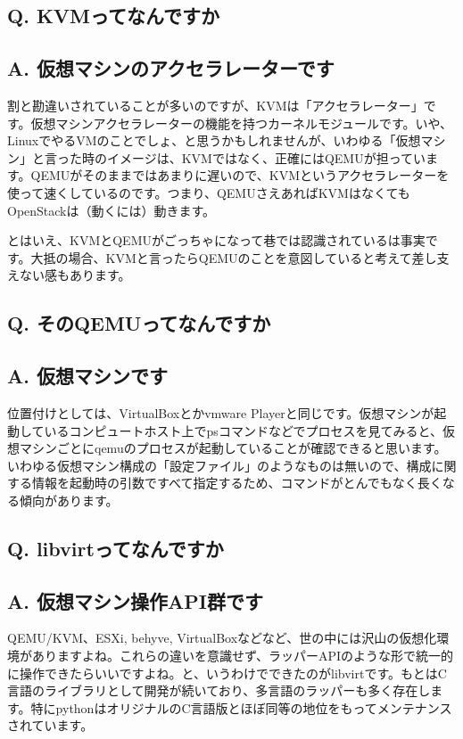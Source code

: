 \documentclass[9pt,b5paper,tombo,openany]{jsbook}
\begin{document}
\subsection*{{\bfseries Q.} KVMってなんですか}
\subsection*{{\bfseries A.} 仮想マシンのアクセラレーターです}
割と勘違いされていることが多いのですが、KVMは「アクセラレーター」です。仮想マシンアクセラレーターの機能を持つカーネルモジュールです。いや、LinuxでやるVMのことでしょ、と思うかもしれませんが、いわゆる「仮想マシン」と言った時のイメージは、KVMではなく、正確にはQEMUが担っています。QEMUがそのままではあまりに遅いので、KVMというアクセラレーターを使って速くしているのです。つまり、QEMUさえあればKVMはなくてもOpenStackは（動くには）動きます。

とはいえ、KVMとQEMUがごっちゃになって巷では認識されているは事実です。大抵の場合、KVMと言ったらQEMUのことを意図していると考えて差し支えない感もあります。

\subsection*{{\bfseries Q.} そのQEMUってなんですか}
\subsection*{{\bfseries A.} 仮想マシンです}
位置付けとしては、VirtualBoxとかvmware Playerと同じです。仮想マシンが起動しているコンピュートホスト上でpsコマンドなどでプロセスを見てみると、仮想マシンごとにqemuのプロセスが起動していることが確認できると思います。いわゆる仮想マシン構成の「設定ファイル」のようなものは無いので、構成に関する情報を起動時の引数ですべて指定するため、コマンドがとんでもなく長くなる傾向があります。

\subsection*{{\bfseries Q.} libvirtってなんですか}
\subsection*{{\bfseries A.} 仮想マシン操作API群です}
QEMU/KVM、ESXi, behyve, VirtualBoxなどなど、世の中には沢山の仮想化環境がありますよね。これらの違いを意識せず、ラッパーAPIのような形で統一的に操作できたらいいですよね。と、いうわけでできたのがlibvirtです。もとはC言語のライブラリとして開発が続いており、多言語のラッパーも多く存在します。特にpythonはオリジナルのC言語版とほぼ同等の地位をもってメンテナンスされています。
\end{document}
